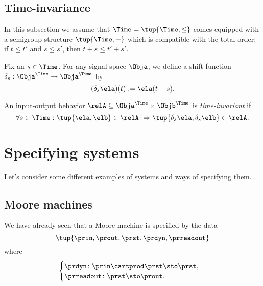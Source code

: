 
\subsection{Time-invariance}

In this subsection we assume that $\Time = \tup{\Time, \leq}$ comes equipped with a semigroup structure $\tup{\Time, +}$ which is compatible with the total order: if $t \leq t'$ and $s \leq s'$, then $t + s \leq t' + s'$.

Fix an $s \in \Time$.
For any signal space $\Obja$, we define a shift function $\delta_s: \Obja^\Time \to \Obja^\Time$ by
\begin{equation}
    (\delta_s \ela)(t) := \ela(t + s).
\end{equation}

\begin{definition}
    An input-output behavior $\relA \subseteq \Obja^\Time \times \Objb^\Time$ is \emph{time-invariant} if
    \begin{equation}
        \forall s \in \Time: \tup{\ela, \elb} \in \relA  \ \Rightarrow \tup{\delta_s \ela, \delta_s \elb} \in \relA.
    \end{equation}
\end{definition}



\section{Specifying systems}

Let's consider some different examples of systems and ways of specifying them.

\subsection{Moore machines}

We have already seen that a Moore machine is specified by the data
\begin{equation}
\tup{\prin, \prout, \prst, \prdyn, \prreadout}
\end{equation}
where 
\begin{equation}\label{eq:moore-specification-again}
    \begin{cases}
        \prdyn \colon \prin \cartprod \prst \sto \prst, \\
        \prreadout \colon \prst \sto \prout.
    \end{cases}
\end{equation}

